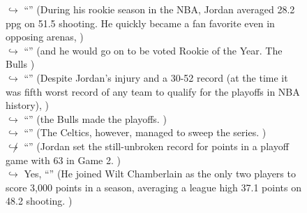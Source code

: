 \documentclass[11pt,a4paper, onecolumn]{article}
\begin{document}
\begin{figure}[t] \small \begin{tcolorbox}[boxsep=0pt,left=5pt,right=0pt,top=2pt,colback = yellow!5] \begin{dialogue}
 \small 
\colorbox{pink!25}{$\hookrightarrow$}
{ ``'' (During his rookie season in the NBA, Jordan averaged 28.2 ppg on 51.5  shooting. He quickly became a fan favorite even in opposing arenas, ) }
\\
\colorbox{pink!25}{$\hookrightarrow$}
{ ``'' (and he would go on to be voted Rookie of the Year. The Bulls ) }
\\
\colorbox{pink!25}{$\hookrightarrow$}
{ ``'' (Despite Jordan's injury and a 30-52 record (at the time it was fifth worst record of any team to qualify for the playoffs in NBA history), ) }
\\
\colorbox{pink!25}{$\hookrightarrow$}
{ ``'' (the Bulls made the playoffs. ) }
\\
\colorbox{pink!25}{$\hookrightarrow$}
{ ``'' (The Celtics, however, managed to sweep the series. ) }
\\
\colorbox{pink!25}{$\not\hookrightarrow$}
{ ``'' (Jordan set the still-unbroken record for points in a playoff game with 63 in Game 2. ) }
\\
\colorbox{pink!25}{$\hookrightarrow$}
\colorbox{red!25}{Yes,}
{ ``'' (He joined Wilt Chamberlain as the only two players to score 3,000 points in a season, averaging a league high 37.1 points on 48.2  shooting. ) }
\\
 \end{dialogue}\end{tcolorbox}\end{figure}
\end{document}
